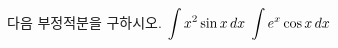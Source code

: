 다음 부정적분을 구하시오.
 $\displaystyle\int x^2\sin x\mkern3mu dx$
 $\displaystyle\int e^x\cos x\mkern3mu dx$
